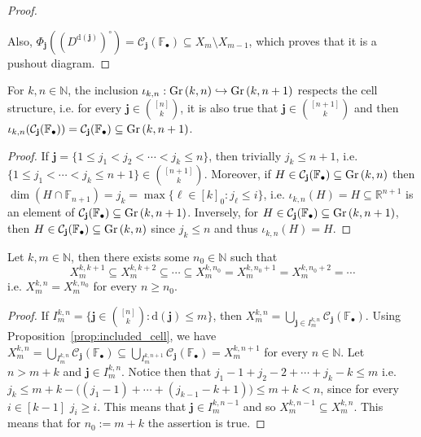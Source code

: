 \begin{proof}
\begin{center}
\begin{tikzcd}
\end{tikzcd}
\end{center}
Also, $\Phi_{\mathbf{j}}((D^{\mathrm{d}(\mathbf{j})})^{\circ})=\mathcal{C}_{\mathbf{j}}(\mathbb{F}_{\bullet})\subseteq X_m\setminus X_{m-1}$, which proves that it is a pushout diagram.
\end{proof}

\begin{proposition}\label{prop:included_cell} For $k,n\in\mathbb{N}$, the inclusion $\iota_{k,n}:\Gr{k}{n}\hookrightarrow\Gr{k}{n+1}$ respects the cell structure, i.e. for every $\mathbf{j}\in\binom{[n]}{k}$, it is also true that $\mathbf{j}\in\binom{[n+1]}{k}$ and then $\iota_{k,n}(\mathcal{C}_{\mathbf{j}}(\mathbb{F}_{\bullet}))=\mathcal{C}_{\mathbf{j}}(\mathbb{F}_{\bullet})\subseteq\Gr{k}{n+1}$.
\end{proposition}
\begin{proof} If $\mathbf{j}=\{1\leq j_1<j_2<\cdots<j_k\leq n\}$, then trivially $j_k\leq n+1$, i.e. $\{1\leq j_1<\cdots<j_k\leq n+1\}\in\binom{[n+1]}{k}$. Moreover, if $H\in\mathcal{C}_{\mathbf{j}}(\mathbb{F}_{\bullet})\subseteq\Gr{k}{n}$ then $\dim(H\cap\mathbb{F}_{n+1})=j_k=\max\{\ell\in[k]_0:j_{\ell}\leq i\}$, i.e. $\iota_{k,n}(H)=H\subseteq\mathbb{R}^{n+1}$ is an element of $\mathcal{C}_{\mathbf{j}}(\mathbb{F}_{\bullet})\subseteq\Gr{k}{n+1}$. Inversely, for $H\in\mathcal{C}_{\mathbf{j}}(\mathbb{F}_{\bullet})\subseteq\Gr{k}{n+1}$, then $H\in\mathcal{C}_{\mathbf{j}}(\mathbb{F}_{\bullet})\subseteq\Gr{k}{n}$ since $j_k\leq n$ and thus $\iota_{k,n}(H)=H$.
\end{proof}

\begin{lemma}\label{lem:stable_filtration} Let $k,m\in\mathbb{N}$, then there exists some $n_0\in\mathbb{N}$ such that
\[X_m^{k,k+1}\subseteq X_m^{k,k+2}\subseteq\cdots\subseteq X_m^{k,n_0}=X_m^{k,n_0+1}=X_m^{k,n_0+2}=\cdots\]
i.e. $X_m^{k,n}=X_m^{k,n_0}$ for every $n\geq n_0$.
\end{lemma}
\begin{proof} If $I_m^{k,n}=\{\mathbf{j}\in\binom{[n]}{k}:\mathrm{d}(\mathbf{j})\leq m\}$, then $X_m^{k,n}=\bigcup_{\mathbf{j}\in I_m^{k,n}}\mathcal{C}_{\mathbf{j}}(\mathbb{F}_{\bullet})$. Using Proposition~\ref{prop:included_cell}, we have $X_m^{k,n}=\bigcup_{I_m^{k,n}}\mathcal{C}_{\mathbf{j}}(\mathbb{F}_{\bullet})\subseteq\bigcup_{I_m^{k,n+1}}\mathcal{C}_{\mathbf{j}}(\mathbb{F}_{\bullet})=X_m^{k,n+1}$ for every $n\in\mathbb{N}$. Let $n>m+k$ and $\mathbf{j}\in I_m^{k,n}$. Notice then that $j_1-1+j_2-2+\cdots+j_k-k\leq m$ i.e. $j_k\leq m+k-\big((j_1-1)+\cdots+(j_{k-1}-k+1)\big)\leq m+k<n$, since for every $i\in[k-1]$ $j_i\geq i$. This means that $\mathbf{j}\in I_m^{k,n-1}$ and so $X_m^{k,n-1}\subseteq X_m^{k,n}$. This means that for $n_0:=m+k$ the assertion is true.
\end{proof}

